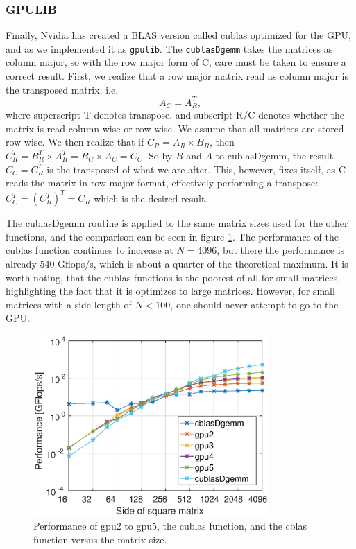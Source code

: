 \subsubsection{GPULIB}
Finally, Nvidia has created a BLAS version called cublas optimized for the GPU, and as we implemented it as \texttt{gpulib}. The \texttt{cublasDgemm} takes the matrices as column major, so with the row major form of C, care must be taken to ensure a correct result. First, we realize that a row major matrix read as column major is the transposed matrix, i.e.
\begin{equation}
A_C = A_R^T,
\end{equation}
where superscript T denotes transpose, and subscript R/C denotes whether the matrix is read column wise or row wise. We assume that all matrices are stored row wise. We then realize that if $C_R = A_R\times B_R$, then $C_R^T = B_R^T \times A_R^T = B_C \times A_C = C_C$. So by $B$ and $A$ to cublasDgemm, the result $C_C = C_R^T$ is the transposed of what we are after. This, however, fixes itself, as C reads the matrix in row major format, effectively performing a transpose: $C_C^T = (C_R^T)^T = C_R$ which is the desired result.

The cublasDgemm routine is applied to the same matrix sizes used for the other functions, and the comparison can be seen in figure \ref{fig:gpuALL}. The performance of the cublas function continues to increase at $N =4096$, but there the performance is already 540 Gflops/s, which is about a quarter of the theoretical maximum. It is worth noting, that the cublas functions is the poorest of all for small matrices, highlighting the fact that it is optimizes to large matrices. However, for small matrices with a side length of $N< 100$, one should never attempt to go to the GPU.

\begin{figure}
\centering
\includegraphics[width = 0.8\textwidth]{fig/gpulib.eps}
\caption{Performance of gpu2 to gpu5, the cublas function, and the cblas function versus the matrix size.}
\label{fig:gpuALL}
\end{figure}